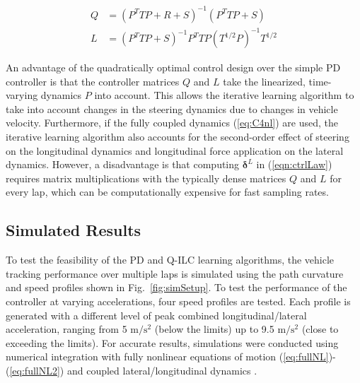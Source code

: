 \documentclass[9pt,shortpaper,twoside,web]{ieeecolor}
\begin{document}
{{{\begin{subequations}
\label{eq:analSol}
\begin{align}
	Q &= (P^TTP + R + S)^{-1}(P^TTP + S)\\
	L &= (P^TTP + S)^{-1}P^TTP(T^{1/2}P)^{-1}T^{1/2}
\end{align}
\end{subequations}

An advantage of the quadratically optimal control design over the simple PD controller is that the controller matrices $Q$ and $L$ take the linearized, time-varying dynamics $P$ into account. 
This allows the iterative learning algorithm
to take into account changes in the steering dynamics due to changes in vehicle velocity.
Furthermore, if the fully coupled dynamics (\ref{eq:C4nl}) are used, the iterative learning algorithm also accounts for the
second-order effect of steering on the longitudinal dynamics and longitudinal force application on the lateral dynamics. 
 However, a disadvantage is that computing $\mathbf{\delta}^L$ in (\ref{eqn:ctrlLaw}) requires matrix multiplications with
the typically dense matrices $Q$ and $L$ for every lap, which can be computationally expensive for fast sampling rates. 

\subsection{Simulated Results}
\label{sec:simres}

To test the feasibility of the PD and Q-ILC learning algorithms, the vehicle tracking performance over multiple laps is
simulated using the path curvature and speed profiles shown in Fig.~\ref{fig:simSetup}. To test the performance
of the controller at varying accelerations, four speed profiles are tested. Each profile is
generated with a different level of peak combined longitudinal/lateral acceleration, ranging from 5 $\mathrm{m/s^2}$ (below the limits)
up to 9.5 $\mathrm{m/s^2}$ (close to exceeding the limits). For accurate results, simulations were conducted using numerical integration with
 fully nonlinear equations of motion (\ref{eq:fullNL})-(\ref{eq:fullNL2}) and coupled lateral/longitudinal dynamics \cite{rami}.

}}}
\end{document}
